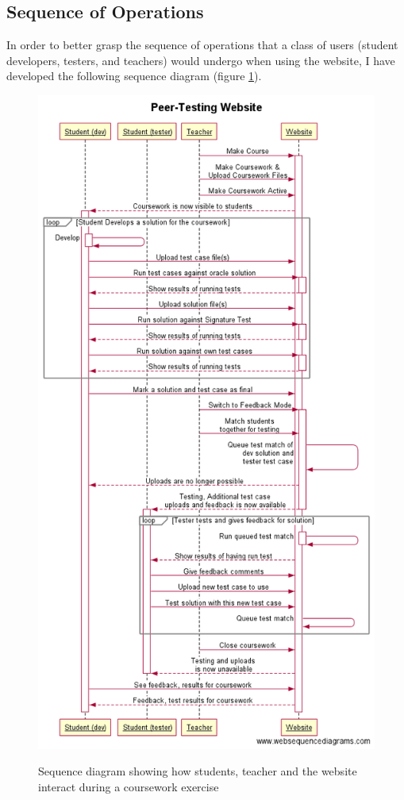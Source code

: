 \documentclass[a4paper,11pt]{report}
\begin{document}
\subsection{Sequence of Operations}
In order to better grasp the sequence of operations that a class of users (student developers, testers, and teachers) would undergo when using the website, I have developed the following sequence diagram (figure \ref{fig:seqd}).\\
\begin{figure}[ht]
\centering
\includegraphics[height=0.9\textheight]{fig/seq.png}
\label{fig:seqd}
\caption{Sequence diagram showing how students, teacher and the website interact during a coursework exercise}
\end{figure}
\end{document}
